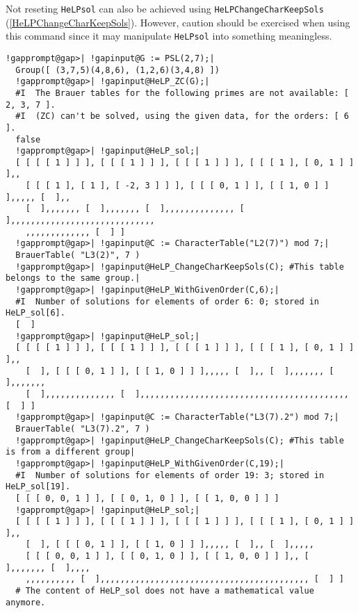 \documentclass[a4paper,11pt]{report}
\begin{document}
{{ Not reseting \texttt{HeLP{\textunderscore}sol} can also be achieved using \texttt{HeLP{\textunderscore}ChangeCharKeepSols} (\ref{HeLPChangeCharKeepSols}). However, caution should be exercised when using this command since it may
manipulate \texttt{HeLP{\textunderscore}sol} into something meaningless. 
\begin{Verbatim}[commandchars=!@|,fontsize=\small,frame=single,label=Example]
  !gapprompt@gap>| !gapinput@G := PSL(2,7);|
  Group([ (3,7,5)(4,8,6), (1,2,6)(3,4,8) ])
  !gapprompt@gap>| !gapinput@HeLP_ZC(G);|
  #I  The Brauer tables for the following primes are not available: [ 2, 3, 7 ].
  #I  (ZC) can't be solved, using the given data, for the orders: [ 6 ].
  false
  !gapprompt@gap>| !gapinput@HeLP_sol;|
  [ [ [ [ 1 ] ] ], [ [ [ 1 ] ] ], [ [ [ 1 ] ] ], [ [ [ 1 ], [ 0, 1 ] ] ],, 
    [ [ [ 1 ], [ 1 ], [ -2, 3 ] ] ], [ [ [ 0, 1 ] ], [ [ 1, 0 ] ] ],,,,, [  ],, 
    [  ],,,,,,, [  ],,,,,,, [  ],,,,,,,,,,,,,, [  ],,,,,,,,,,,,,,,,,,,,,,,,,,,,,
    ,,,,,,,,,,,,, [  ] ]
  !gapprompt@gap>| !gapinput@C := CharacterTable("L2(7)") mod 7;|
  BrauerTable( "L3(2)", 7 )
  !gapprompt@gap>| !gapinput@HeLP_ChangeCharKeepSols(C); #This table belongs to the same group.|
  !gapprompt@gap>| !gapinput@HeLP_WithGivenOrder(C,6);|
  #I  Number of solutions for elements of order 6: 0; stored in HeLP_sol[6].
  [  ]
  !gapprompt@gap>| !gapinput@HeLP_sol;|
  [ [ [ [ 1 ] ] ], [ [ [ 1 ] ] ], [ [ [ 1 ] ] ], [ [ [ 1 ], [ 0, 1 ] ] ],, 
    [  ], [ [ [ 0, 1 ] ], [ [ 1, 0 ] ] ],,,,, [  ],, [  ],,,,,,, [  ],,,,,,, 
    [  ],,,,,,,,,,,,,, [  ],,,,,,,,,,,,,,,,,,,,,,,,,,,,,,,,,,,,,,,,,, [  ] ]
  !gapprompt@gap>| !gapinput@C := CharacterTable("L3(7).2") mod 7;|
  BrauerTable( "L3(7).2", 7 )
  !gapprompt@gap>| !gapinput@HeLP_ChangeCharKeepSols(C); #This table is from a different group|
  !gapprompt@gap>| !gapinput@HeLP_WithGivenOrder(C,19);|
  #I  Number of solutions for elements of order 19: 3; stored in HeLP_sol[19].
  [ [ [ 0, 0, 1 ] ], [ [ 0, 1, 0 ] ], [ [ 1, 0, 0 ] ] ]
  !gapprompt@gap>| !gapinput@HeLP_sol;|
  [ [ [ [ 1 ] ] ], [ [ [ 1 ] ] ], [ [ [ 1 ] ] ], [ [ [ 1 ], [ 0, 1 ] ] ],, 
    [  ], [ [ [ 0, 1 ] ], [ [ 1, 0 ] ] ],,,,, [  ],, [  ],,,,, 
    [ [ [ 0, 0, 1 ] ], [ [ 0, 1, 0 ] ], [ [ 1, 0, 0 ] ] ],, [  ],,,,,,, [  ],,,,
    ,,,,,,,,,, [  ],,,,,,,,,,,,,,,,,,,,,,,,,,,,,,,,,,,,,,,,,, [  ] ]
  # The content of HeLP_sol does not have a mathematical value anymore.
\end{Verbatim}
}}
\end{document}
